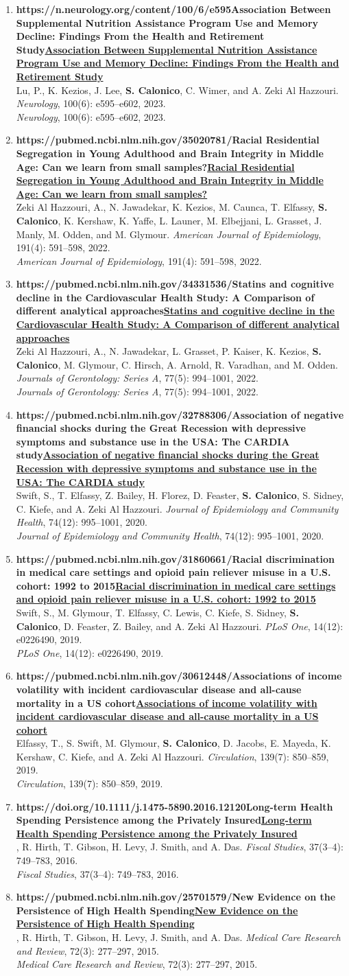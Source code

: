 \documentclass[11pt]{article}
\newcommand{\me}[1]{{\color{ink}\bfseries #1}}
\newcommand{\pub}[4]{\item \begin{minipage}[t]{\linewidth}\raggedright
  {\bfseries\def\puburl{#1}\ifx\puburl\empty #2\else\href{#1}{#2}\fi}\\[-0.5pt]%
  {\sffamily\footnotesize\color{muted}#3}%
  \def\pubvenue{#4}\ifx\pubvenue\empty\else\\[-0.5pt]{\small #4}\fi\strut\end{minipage}}
\begin{document}
\begin{enumerate}[resume, leftmargin=*]
\pub{https://n.neurology.org/content/100/6/e595}{Association Between Supplemental Nutrition Assistance Program Use and Memory Decline: Findings From the Health and Retirement Study}{Lu, P., K. Kezios, J. Lee, \me{S. Calonico}, C. Wimer, and A. Zeki Al Hazzouri.}{\emph{Neurology}, 100(6): e595--e602, 2023.}

\pub{https://pubmed.ncbi.nlm.nih.gov/35020781/}{Racial Residential Segregation in Young Adulthood and Brain Integrity in Middle Age: Can we learn from small samples?}{Zeki Al Hazzouri, A., N. Jawadekar, K. Kezios, M. Caunca, T. Elfassy, \me{S. Calonico}, K. Kershaw, K. Yaffe, L. Launer, M. Elbejjani, L. Grasset, J. Manly, M. Odden, and M. Glymour.}{\emph{American Journal of Epidemiology}, 191(4): 591--598, 2022.}

\pub{https://pubmed.ncbi.nlm.nih.gov/34331536/}{Statins and cognitive decline in the Cardiovascular Health Study: A Comparison of different analytical approaches}{Zeki Al Hazzouri, A., N. Jawadekar, L. Grasset, P. Kaiser, K. Kezios, \me{S. Calonico}, M. Glymour, C. Hirsch, A. Arnold, R. Varadhan, and M. Odden.}{\emph{Journals of Gerontology: Series A}, 77(5): 994--1001, 2022.}

\pub{https://pubmed.ncbi.nlm.nih.gov/32788306/}{Association of negative financial shocks during the Great Recession with depressive symptoms and substance use in the USA: The CARDIA study}{Swift, S., T. Elfassy, Z. Bailey, H. Florez, D. Feaster, \me{S. Calonico}, S. Sidney, C. Kiefe, and A. Zeki Al Hazzouri.}{\emph{Journal of Epidemiology and Community Health}, 74(12): 995--1001, 2020.}

\pub{https://pubmed.ncbi.nlm.nih.gov/31860661/}{Racial discrimination in medical care settings and opioid pain reliever misuse in a U.S. cohort: 1992 to 2015}{Swift, S., M. Glymour, T. Elfassy, C. Lewis, C. Kiefe, S. Sidney, \me{S. Calonico}, D. Feaster, Z. Bailey, and A. Zeki Al Hazzouri.}{\emph{PLoS One}, 14(12): e0226490, 2019.}

\pub{https://pubmed.ncbi.nlm.nih.gov/30612448/}{Associations of income volatility with incident cardiovascular disease and all-cause mortality in a US cohort}{Elfassy, T., S. Swift, M. Glymour, \me{S. Calonico}, D. Jacobs, E. Mayeda, K. Kershaw, C. Kiefe, and A. Zeki Al Hazzouri.}{\emph{Circulation}, 139(7): 850--859, 2019.}

\pub{https://doi.org/10.1111/j.1475-5890.2016.12120}{Long-term Health Spending Persistence among the Privately Insured}{\me{Calonico, S.}, R. Hirth, T. Gibson, H. Levy, J. Smith, and A. Das.}{\emph{Fiscal Studies}, 37(3--4): 749--783, 2016.}

\pub{https://pubmed.ncbi.nlm.nih.gov/25701579/}{New Evidence on the Persistence of High Health Spending}{\me{Calonico, S.}, R. Hirth, T. Gibson, H. Levy, J. Smith, and A. Das.}{\emph{Medical Care Research and Review}, 72(3): 277--297, 2015.}
\end{enumerate}  
\end{document}
